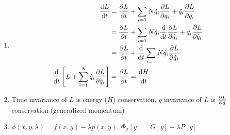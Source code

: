 \documentclass{article}
\theoremstyle{remark}
\theoremstyle{remark}
\begin{document}
\begin{enumerate}
\begin{itemize}
        \end{itemize}
        \item \begin{align*}
            \dv{L}{t} &=\pdv{L}{t}+\sum_{i=1}{N}\dot q_i\pdv{L}{q_i} + \ddot q_i\pdv{L}{\dot q_i}\\
                      &= \pdv{L}{t}+\sum_{i=1}{N}\dot q_i\dv{t}\pdv{L}{\dot q_i} + \ddot q_i\pdv{L}{\dot q_i}\\
                      &= \pdv{L}{t}+\dv{t}\sum_{i=1}{N}\dot q_i\pdv{L}{\dot q_i}\\
            \dv{t}\left[L+\sum_{i=1}^N\dot q_i\pdv{L}{\dot q_i}\right] &= \pdv{L}{t} = \dv{H}{t}
        \end{align*}
        \item Time invariance of $L$ is energy ($H$) conservation, $q$ invariance of $L$ is $\pdv{L}{\dot q}$ conservation (generalized momentum)
        \item $\phi(x,y,\lambda)=f(x,y)-\lambda p(x,y)$, $\Phi_\lambda[y]=G[y]-\lambda P[y]$
    \end{enumerate}
\end{document}
